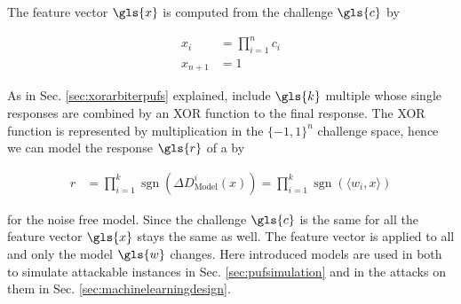 The feature vector $\gls{x}$ is computed from the challenge $\gls{c}$ by

\begin{equation}
\begin{aligned}
x_i &= \prod_{i=1}^n c_i\\ 
x_{n+1} &= 1 \label{equ:featurevector}
\end{aligned}
\end{equation}

As in Sec. \ref{sec:xorarbiterpufs} explained, \xpufs include $\gls{k}$ multiple \apufs whose single responses are combined by an \ac{XOR} function to the final response.
The \ac{XOR} function is represented by multiplication in the $\{-1,1\}^n$ challenge space, hence we can model the response $\gls{r}$ of a \xpuf by

\begin{align*}
r &= \prod_{i=1}^k \operatorname{sgn}(\Delta D_{\mathrm{Model}}^i(x)) = \prod_{i=1}^k \operatorname{sgn}(\langle w_i,x\rangle)
\end{align*}

for the noise free \xpuf model.
Since the challenge $\gls{c}$ is the same for all \apufs the feature vector $\gls{x}$ stays the same as well.
The feature vector is applied to all \apufs and only the \apuf model $\gls{w}$ changes. %
Here introduced models are used in both to simulate attackable \apuf instances in Sec. \ref{sec:pufsimulation} and in the attacks on them in Sec. \ref{sec:machinelearningdesign}.






